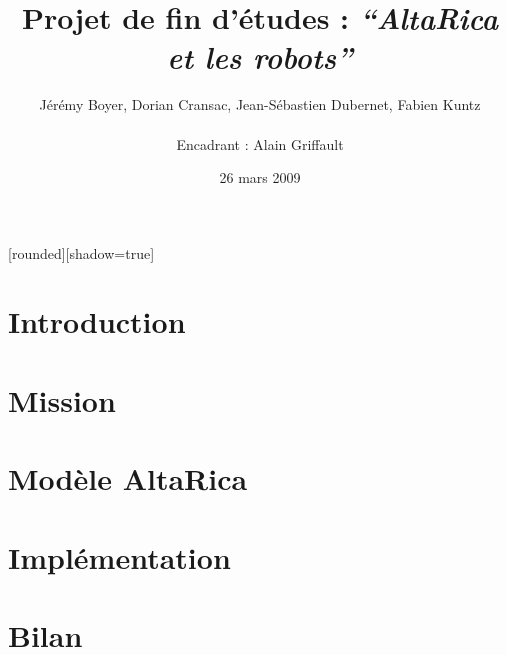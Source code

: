 \documentclass[8pt]{beamer}
\begin{document}

[rounded][shadow=true]

\author[J. Boyer, D. Cransac, J-S. Dubernet, F. Kuntz - Encadrant :
A. Griffault]{Jérémy Boyer, Dorian Cransac, Jean-Sébastien Dubernet,
Fabien Kuntz\\
~\\
\small Encadrant : Alain Griffault}
\title{Projet de fin d'études : \textit{``AltaRica et les robots''}} 
\date{\footnotesize 26 mars 2009}

\setcounter{page}{1}

\frame{\titlepage}
\frame{\tableofcontents}

 \section{Introduction}
 \frame{\tableofcontents[current]}
 

 \section{Mission}
 \frame{\tableofcontents[current]}
%  
%  

 \section{Modèle AltaRica}
 \frame{\tableofcontents[current]}
 
  
 \section{Implémentation}
 \frame{\tableofcontents[current]}
  
%  

 \section{Bilan}
 \frame{\tableofcontents[current]}


\end{document}
